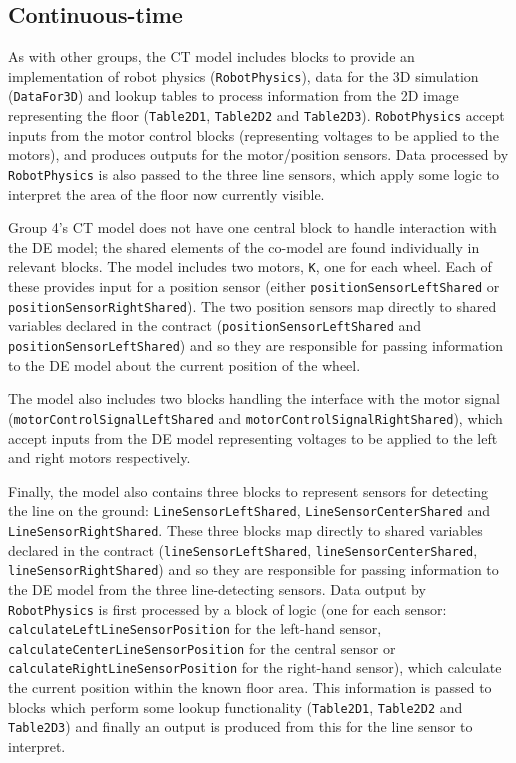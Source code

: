 \subsection{Continuous-time} 
As with other groups, the CT model includes blocks to provide an
implementation of robot physics (\texttt{RobotPhysics}), data for the
3D simulation (\texttt{DataFor3D}) and lookup tables to process
information from the 2D image representing the floor
(\texttt{Table2D1}, \texttt{Table2D2} and \texttt{Table2D3}).
\texttt{RobotPhysics} accept inputs from the motor control blocks
(representing voltages to be applied to the motors), and produces
outputs for the motor/position sensors.  Data processed by
\texttt{RobotPhysics} is also passed to the three line sensors, which
apply some logic to interpret the area of the floor now currently
visible.

Group 4's CT model does not have one central block to handle
interaction with the DE model; the shared elements of the co-model are
found individually in relevant blocks.  The model includes two motors,
\texttt{K}, one for each wheel.  Each of these provides input for a
position sensor (either \texttt{positionSensorLeftShared} or
\texttt{positionSensorRightShared}).  The two position sensors map
directly to shared variables declared in the contract
(\texttt{positionSensorLeftShared} and
\texttt{positionSensorLeftShared}) and so they are responsible for
passing information to the DE model about the current position of the
wheel.

The model also includes two blocks handling the interface with the
motor signal (\texttt{motor\-Con\-trol\-Signal\-Left\-Shared} and
\texttt{motorControlSignalRightShared}), which accept inputs from the
DE model representing voltages to be applied to the left and right
motors respectively.

Finally, the model also contains three blocks to represent sensors for
detecting the line on the ground: \texttt{LineSensorLeftShared},
\texttt{LineSensorCenterShared} and \texttt{LineSensor\-Right\-Shared}.
These three blocks map directly to shared variables declared in the
contract (\texttt{lineSensorLeftShared},
\texttt{lineSensorCenterShared}, \texttt{lineSensorRightShared}) and
so they are responsible for passing information to the DE model from
the three line-detecting sensors.  Data output by
\texttt{RobotPhysics} is first processed by a block of logic (one for
each sensor: \texttt{calculateLeftLineSensorPosition} for the
left-hand sensor, \texttt{calculateCenter\-LineSensorPosition} for the
central sensor or \texttt{calculateRightLineSensorPosition} for the
right-hand sensor), which calculate the current position within the
known floor area.  This information is passed to blocks which perform
some lookup functionality (\texttt{Table2D1}, \texttt{Table2D2} and
\texttt{Table2D3}) and finally an output is produced from this for the
line sensor to interpret.





